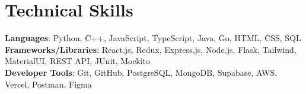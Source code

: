 \section{Technical Skills}
\begin{itemize}[leftmargin=0.15in, label={}]
    \small{\item{     
        \textbf{Languages}{: Python, C++, JavaScript, TypeScript, Java, Go, HTML, CSS, SQL} \\
     
        \textbf{Frameworks/Libraries}{: React.js, Redux, Express.js, Node.js, Flask, Tailwind, MaterialUI, REST API, JUnit, Mockito} \\

        \textbf{Developer Tools}{: Git, GitHub, PostgreSQL, MongoDB, Supabase, AWS, Vercel, Postman, Figma} \\
    }}
\end{itemize}